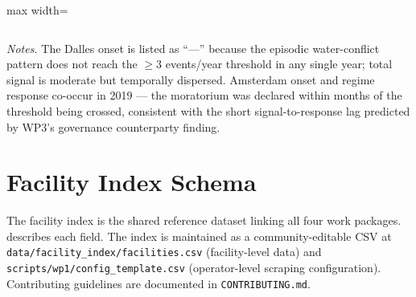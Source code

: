 \begin{fullwidth}
\begin{adjustbox}{max width=\linewidth}
\begin{tabular}{>{\raggedright}p{2.8cm}rrrr>{\raggedright}p{3.0cm}>{\raggedright\arraybackslash}p{4.2cm}}
\bottomrule
\end{tabular}
\end{adjustbox}
\vspace{0.4em}
\begin{flushleft}
\footnotesize\textit{Notes.} The Dalles onset is listed as ``---'' because the
episodic water-conflict pattern does not reach the $\geq 3$ events/year threshold
in any single year; total signal is moderate but temporally dispersed.
Amsterdam onset and regime response co-occur in 2019 — the moratorium was
declared within months of the threshold being crossed, consistent with the
short signal-to-response lag predicted by WP3's governance counterparty finding.
\end{flushleft}
\end{fullwidth}

\section{Facility Index Schema}
\label{app:schema}

The facility index is the shared reference dataset linking all four work packages.
 describes each field. The index is maintained as a community-editable
CSV at \texttt{data/facility\_index/facilities.csv} (facility-level data) and
\texttt{scripts/wp1/config\_template.csv} (operator-level scraping configuration).
Contributing guidelines are documented in \texttt{CONTRIBUTING.md}.

